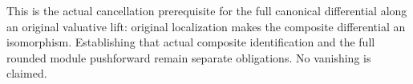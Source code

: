 This is the actual cancellation prerequisite for the full canonical
differential along an original valuative lift: original localization
makes the composite differential an isomorphism. Establishing that
actual composite identification and the full rounded module
pushforward remain separate obligations. No vanishing is claimed.
